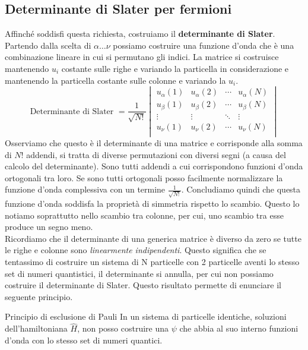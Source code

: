\subsection{Determinante di Slater per fermioni}
\noindent Affinché soddisfi questa richiesta, costruiamo il \textbf{determinante di Slater}. Partendo dalla scelta di $\alpha \dots \nu$ possiamo costruire una funzione d'onda che è una combinazione lineare in cui si permutano gli indici. La matrice si costruisce mantenendo $u_i$ costante sulle righe e variando la particella in considerazione e mantenendo la particella costante sulle colonne e variando la $u_i$.
\begin{equation*}
    \text{Determinante di Slater }=
    \frac{1}{\sqrt{N!}}
    \begin{vmatrix}
        u_\alpha(1) & u_\alpha(2) & \cdots & u_\alpha(N) \\
        u_\beta(1) & u_\beta(2) & \cdots & u_\beta(N) \\
        \vdots & \vdots & \ddots & \vdots \\
        u_\nu(1) & u_\nu(2) & \cdots & u_\nu(N) \\
    \end{vmatrix}
\end{equation*}
Osserviamo che questo è il determinante di una matrice e corrisponde alla somma di $N!$ addendi, si tratta di diverse permutazioni con diversi segni (a causa del calcolo del determinante). Sono tutti addendi a cui corrispondono funzioni d'onda ortogonali tra loro. Se sono tutti ortogonali posso facilmente normalizzare la funzione d'onda complessiva con un termine $\frac{1}{\sqrt{N!}}$. Concludiamo quindi che questa funzione d'onda soddisfa la proprietà di simmetria rispetto lo scambio. Questo lo notiamo soprattutto nello scambio tra colonne, per cui, uno scambio tra esse produce un segno meno. \\

Ricordiamo che il determinante di una generica matrice è diverso da zero se tutte le righe e colonne sono \textit{linearmente indipendenti}. Questo significa che se tentassimo di costruire un sistema di N particelle con 2 particelle aventi lo stesso set di numeri quantistici, il determinante si annulla, per cui non possiamo costruire il determinante di Slater. Questo risultato permette di enunciare il seguente principio.

\begin{definition}{Principio di esclusione di Pauli}
    In un sistema di particelle identiche, soluzioni dell'hamiltoniana $\hat H$, non posso costruire una $\psi$ che abbia al suo interno funzioni d'onda con lo stesso set di numeri quantici.
\end{definition}


